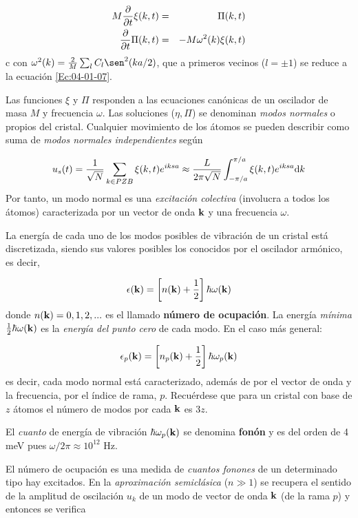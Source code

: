 \begin{eqnarray}
    M \frac{\partial }{\partial t} \xi (k,t) & = & \Pi (k,t) \\
    \frac{\partial }{\partial t} \Pi (k,t) & =  & - M \omega^2 (k) \xi (k,t)    
\end{eqnarray}c
con $\omega^2 (k) = \frac{2}{M} \sum_l C_l \sen^2 ( ka/2)$, que a primeros vecinos ($l=\pm 1$) se reduce a la ecuación \ref{Ec:04-01-07}.

Las funciones $\xi$ y $\Pi$ responden a las ecuaciones canónicas de un oscilador de masa $M$ y frecuencia $\omega$. Las soluciones ($\eta,\Pi$) se denominan \textit{modos normales} o propios del cristal. Cualquier movimiento de los átomos se pueden describir como suma de \textit{modos normales independientes} según

\begin{equation}
    u_s (t) = \frac{1}{\sqrt{N}} \sum_{k \in PZB} \xi (k,t) e^{iksa} \approx \frac{L}{2\pi \sqrt{N}} \int_{-\pi/a}^{\pi/a} \xi (k,t) e^{iksa} \mathrm{d} k
\end{equation}
Por tanto, un modo normal es una \textit{excitación colectiva} (involucra a todos los átomos) caracterizada por un vector de onda $\mathbf{k}$ y una frecuencia $\omega$. 

La energía de cada uno de los modos posibles de vibración de un cristal está discretizada, siendo sus valores posibles los conocidos por el oscilador armónico, es decir,

\begin{equation}
    \epsilon (\mathbf{k}) = \left[ n(\mathbf{k}) + \frac{1}{2} \right] \hbar \omega (\mathbf{k})
\end{equation}
donde $n(\mathbf{k})=0,1,2,...$ es el llamado \textbf{número de ocupación}. La energía \textit{mínima} $\frac{1}{2} \hbar \omega (\mathbf{k})$ es la \textit{energía del punto cero} de cada modo. En el caso más general:
 
\begin{equation}
    \epsilon_p (\mathbf{k}) = \left[ n_p(\mathbf{k}) + \frac{1}{2} \right] \hbar \omega_p ( \mathbf{k})
\end{equation}
es decir, cada modo normal está caracterizado, además de por el vector de onda y la frecuencia, por el índice de rama, $p$. Recuérdese que para un cristal con base de $z$ átomos el número de modos por cada $\mathbf{k}$ es $3z$.  

El \textit{cuanto} de energía de vibración $\hbar \omega_p (\mathbf{k})$ se denomina \textbf{fonón} y es del orden de 4 meV pues $\omega/2\pi\approx 10^{12} $ Hz.

El número de ocupación es una medida de \textit{cuantos fonones} de un determinado tipo hay excitados. En la \textit{aproximación semiclásica} ($n\gg 1$) se recupera el sentido de la amplitud de oscilación $u_k$ de un modo de vector de onda $\mathbf{k}$ (de la rama $p$) y entonces se verifica 

